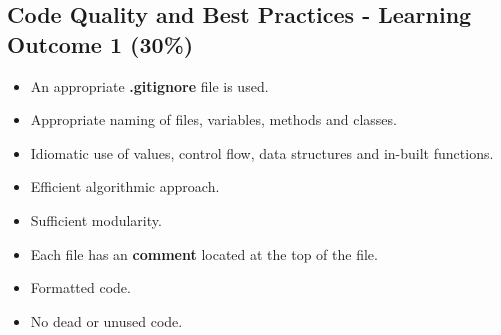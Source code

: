 \documentclass{article}
\begin{document}
\subsection*{Code Quality and Best Practices - Learning Outcome 1 (30\%)}
\begin{itemize}
    \item An appropriate \textbf{.gitignore} file is used. 
    \item Appropriate naming of files, variables, methods and classes.
    \item Idiomatic use of values, control flow, data structures and in-built functions.
    \item Efficient algorithmic approach.
    \item Sufficient modularity.
    \item Each file has an \textbf{comment} located at the top of the file. 
    \item Formatted code.
    \item No dead or unused code.
\end{itemize} 
\end{document}
